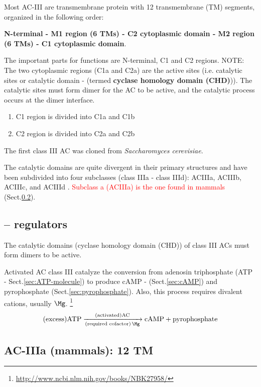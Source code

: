 Most AC-III are transmembrane protein with 12 transmembrane (TM)
segments, organized in the following order:

{\bf N-terminal - M1 region (6 TMs) - C2 cytoplasmic domain - M2 region (6
  TMs) - C1 cytoplasmic domain}.

The important parts for functions are N-terminal, C1 and C2 regions.
NOTE: The two cytoplasmic regions (C1a and C2a) are the active sites (i.e.
catalytic sites or catalytic domain - (termed {\bf cyclase homology domain
(CHD)})). The catalytic sites must form dimer for the AC to be active, and the
catalytic process occurs at the dimer interface.

\begin{enumerate}
  \item C1 region is divided into C1a and C1b
  \item C2 region is divided into C2a and C2b
\end{enumerate}

The  first  class  III  AC  was  cloned  from {\it Saccharomyces cerevisiae}.

The catalytic domains are quite divergent in their primary structures and have
been subdivided into four subclasses (class IIIa - class IIId): ACIIIa, ACIIIb,
ACIIIc, and ACIIId \cite{linder2003}. \textcolor{red}{Subclass a (ACIIIa) is the
one found in mammals} (Sect.\ref{sec:AC-IIIa}).


\subsection{-- regulators}
\label{sec:AC-III-regulator}

The catalytic domains (cyclase homology domain (CHD)) of class III ACs must form
dimers to be active.

Activated AC class III catalyze the conversion from adenosin triphosphate (ATP -
Sect.\ref{sec:ATP-molecule}) to produce cAMP - (Sect.\ref{sec:cAMP}) and
pyrophosphate (Sect.\ref{sec:pyrophosphate}).
Also, this process requires divalent cations, usually $\Mg$.
\footnote{\url{http://www.ncbi.nlm.nih.gov/books/NBK27958/}}
\begin{equation}
\text{(excess)} \ce{ATP ->[\text{(activated)AC}][\text{(required cofactor)}
\Mg] cAMP + pyrophosphate}
\end{equation}


\subsection{AC-IIIa (mammals): 12 TM}
\label{sec:AC-IIIa}

